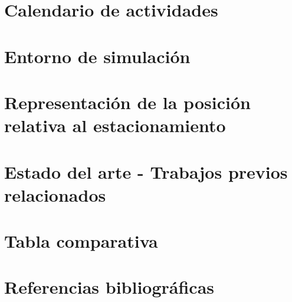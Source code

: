 \documentclass[12pt,letterpaper,final]{article}
\begin{document}
    \section*{Calendario de actividades}
    
    \clearpage

    \section*{Entorno de simulación}
    
    \clearpage

    \section*{Representación de la posición relativa al estacionamiento}
    
    \clearpage

    \section*{Estado del arte - Trabajos previos relacionados}
    

    \section*{Tabla comparativa}
    
    \clearpage

    \section*{Referencias bibliográficas}
    
    
\end{document}
